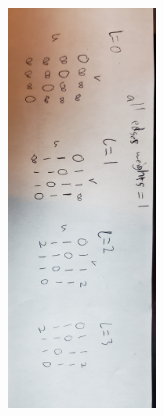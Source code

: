 \documentclass{article}
\begin{document}
\includegraphics[width=250,height=400,keepaspectratio,angle=90]{q6Walkthrough.jpg}
\end{document}
